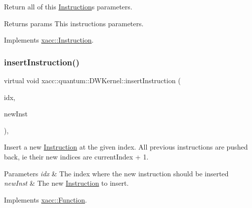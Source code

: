 Return all of this \hyperlink{a01155}{Instruction}\textquotesingle{}s parameters.

\begin{DoxyReturn}{Returns}
params This instructions parameters. 
\end{DoxyReturn}


Implements \hyperlink{a01155_aeb67c67713896e8f27a5c7dd531f3340}{xacc\+::\+Instruction}.

\mbox{\label{a00983_a1627af0141f70fc4a3cd500a13fb31b8}} 
\subsubsection{\texorpdfstring{insert\+Instruction()}{insertInstruction()}}
{\footnotesize\ttfamily virtual void xacc\+::quantum\+::\+D\+W\+Kernel\+::insert\+Instruction (\begin{DoxyParamCaption}\item[{const int}]{idx,  }\item[{Inst\+Ptr}]{new\+Inst }\end{DoxyParamCaption})\hspace{0.3cm}{\ttfamily [inline]}, {\ttfamily [virtual]}}

Insert a new \hyperlink{a01155}{Instruction} at the given index. All previous instructions are pushed back, ie their new indices are current\+Index + 1.


\begin{DoxyParams}{Parameters}
{\em idx} & The index where the new instruction should be inserted \\
\hline
{\em new\+Inst} & The new \hyperlink{a01155}{Instruction} to insert. \\
\hline
\end{DoxyParams}


Implements \hyperlink{a01151_acde702e44bdbc2759b338365218d7ebe}{xacc\+::\+Function}.

\mbox{\label{a00983_a8957ea368244ed4a4ebd85f6bfecb785}} 
